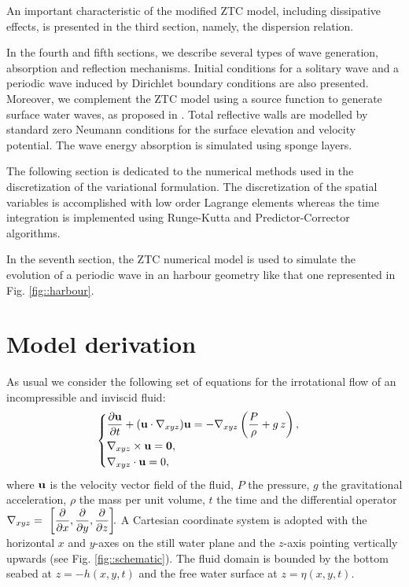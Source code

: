 An important characteristic of the modified ZTC model,
including dissipative effects, 
is presented in the third section, namely,
 the dispersion relation.
 
In the fourth and fifth sections, we describe several types of
wave generation, absorption and reflection mechanisms. 
Initial conditions for a solitary wave  and a periodic wave
induced by Dirichlet boundary conditions are also presented. 
Moreover, we  complement the ZTC model using a  source
function  to generate surface water waves, as  proposed in \cite{WeiKir99}.
Total reflective walls are modelled by standard zero Neumann
conditions for the surface elevation and velocity potential.
The wave energy absorption is simulated using sponge layers. 

The following section is dedicated to the 
numerical methods used in the discretization of the
variational formulation.
The discretization of the spatial variables  is accomplished
with low order Lagrange elements  whereas   the time integration 
is implemented using  Runge-Kutta and Predictor-Corrector algorithms. 

In the seventh section,  the ZTC numerical
model is used to simulate
the evolution of a periodic wave in an harbour  geometry  like that one represented in Fig. \ref{fig::harbour}.


\section{Model derivation}
As usual  we consider the following set of
equations for the irrotational flow of an incompressible and inviscid fluid:
\begin{equation}\label{eq::euler}
\begin{cases}
\displaystyle\frac{\partial  {\bf u}}{\partial 
  t}+({\bf u}\cdot\nabla_{xyz}){\bf u}=-\nabla_{xyz}\left(\frac{P}{\rho} +g\, z\right),\\
\nabla_{xyz}\times {\bf u}={\bf 0},  \\
\nabla_{xyz}\cdot{{\bf u}}=0,
\end{cases}
\end{equation}
where \({\bf u}\) is the  velocity vector field of the fluid, \(P\) the
pressure, \(g\) the gravitational acceleration, \(\rho\) the
mass per unit volume, \(t\) the time and the differential operator \(\displaystyle\nabla_{xyz}=~\left[\frac{\partial }{\partial x},\frac{\partial }{\partial y},\frac{\partial }{\partial z}\right]\!\!.\)
A Cartesian coordinate system is adopted with the
horizontal  \(x\) and \(y\)-axes on the still water plane and
the \(z\)-axis pointing vertically upwards 
(see Fig. \ref{fig::schematic}). The fluid domain is
bounded by the  bottom seabed at \(z=-h(x,y,t)\) and the free
water surface at \(z=\eta(x,y,t)\). 

